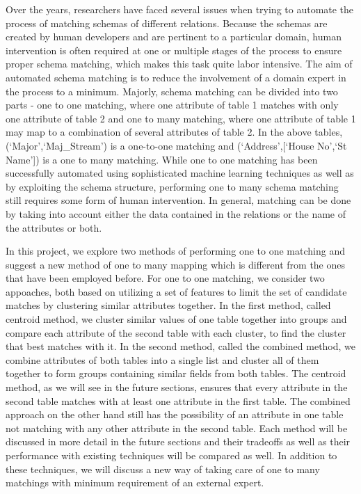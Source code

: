 \documentclass[conference]{IEEEtran}
\begin{document}
Over the years, researchers have faced several issues when trying to automate the process of matching schemas of different relations. Because the schemas are created by human developers and are pertinent to a particular domain, human intervention is often required at one or multiple stages of the process to ensure proper schema matching, which makes this task quite labor intensive. The aim of automated schema matching is to reduce the involvement of a domain expert in the process to a minimum. Majorly, schema matching can be divided into two parts - one to one matching, where one attribute of table 1 matches with only one attribute of table 2 and one to many matching, where one attribute of table 1 may map to a combination of several attributes of table 2. In the above tables, (`Major',`Maj\_Stream') is a one-to-one matching and (`Address',[`House No',`St Name']) is a one to many matching. While one to one matching has been successfully automated using sophisticated machine learning techniques as well as by exploiting the schema structure, performing one to many schema matching still requires some form of human intervention. In general, matching can be done by taking into account either the data contained in the relations or the name of the attributes or both.

In this project, we explore two methods of performing one to one matching and suggest a new method of one to many mapping which is different from the ones that have been employed before. For one to one matching, we consider two appoaches, both based on utilizing a set of features to limit the set of candidate matches by clustering similar attributes together. In the first method, called centroid method, we cluster similar values of one table together into groups and compare each attribute of the second table with each cluster, to find the cluster that best matches with it. In the second method, called the combined method, we combine attributes of both tables into a single list and cluster all of them together to form groups containing similar fields from both tables. The centroid method, as we will see in the future sections, ensures that every attribute in the second table matches with at least one attribute in the first table. The combined approach on the other hand still has the possibility of an attribute in one table not matching with any other attribute in the second table. Each method will be discussed in more detail in the future sections and their tradeoffs as well as their performance with existing techniques will be compared as well. In addition to these techniques, we will discuss a new way of taking care of one to many matchings with minimum requirement of an external expert.
\end{document}
